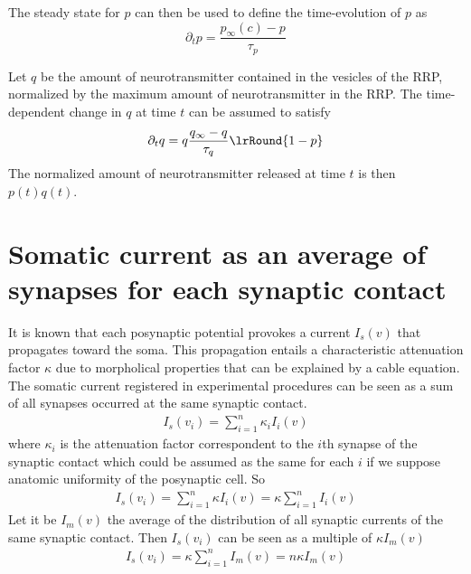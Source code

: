 The steady state for $p$ can then be used to define the time-evolution of $p$ as 
\begin{equation}
\partial_t p = \frac{p_{\infty}(c) - p}{\tau_p}  
\label{eq:pRelDynamics}
\end{equation}

Let $q$ be the amount of neurotransmitter contained in the vesicles of the RRP, normalized by the maximum amount of neurotransmitter in the RRP. The time-dependent change in $q$ at time $t$ can be assumed to satisfy
\begin{equation}
\partial_t q = q \frac{q_{\infty} - q}{\tau_q} \lrRound{1- p}
\label{eq:ntRRPDynamics}
\end{equation}
The normalized amount of neurotransmitter released at time $t$ is then $p(t) q(t)$. 



\section{Somatic current as an average of synapses for each synaptic contact}
It is known that each posynaptic potential provokes a current $I_s(v)$ that   propagates toward the soma. This propagation entails a characteristic attenuation factor $\kappa$ due to morpholical properties that can be explained by a cable equation. The somatic current registered in experimental procedures can be seen as a sum of all synapses occurred at the same synaptic contact.
\begin{eqnarray}
I_s(v_i)=\sum_{i=1}^n\kappa_iI_i(v)
\end{eqnarray}
where $\kappa_i$ is the  attenuation factor correspondent to the $i$th synapse of the synaptic contact which could be assumed as the same for each $i$ if we suppose anatomic uniformity of the posynaptic cell.   
So 
\begin{eqnarray}
I_s(v_i)=\sum_{i=1}^n\kappa I_i(v)=\kappa \sum_{i=1}^n I_i(v)
\end{eqnarray}
Let it be $I_m(v)$ the average of the distribution of all synaptic currents of the same synaptic contact. Then $I_s(v_i)$ can be seen as a multiple of $\kappa I_m(v)$ 
\begin{eqnarray}
I_s(v_i)=\kappa \sum_{i=1}^n I_m(v)=n\kappa I_m(v)
\end{eqnarray}

